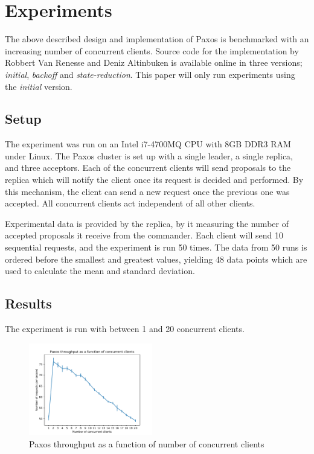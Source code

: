 \documentclass[conference]{IEEEtran}
\begin{document}
\section{Experiments}
The above described design and implementation of Paxos is benchmarked with an increasing number of concurrent clients.
Source code for the implementation by Robbert Van Renesse and Deniz Altinbuken is available online in three versions\cite{VanRenesse:Internet}; \textit{initial}, \textit{backoff} and \textit{state-reduction}.
This paper will only run experiments using the \textit{initial} version.

\subsection{Setup}
The experiment was run on an Intel i7-4700MQ CPU with 8GB DDR3 RAM under Linux.
The Paxos cluster is set up with a single leader, a single replica, and three acceptors.
Each of the concurrent clients will send proposals to the replica which will notify the client once its request is decided and performed. By this mechanism, the client can send a new request once the previous one was accepted.
All concurrent clients act independent of all other clients.

Experimental data is provided by the replica, by it measuring the number of accepted proposals it receive from the commander.
Each client will send 10 sequential requests, and the experiment is run 50 times.
The data from 50 runs is ordered before the smallest and greatest values, yielding 48 data points which are used to calculate the mean and standard deviation.

\subsection{Results}
The experiment is run with between 1 and 20 concurrent clients.

\begin{figure}[h]
	\includegraphics[width=0.48\textwidth]{figures/small_screen.pdf}
	\caption{Paxos throughput as a function of number of concurrent clients}
	\label{fig:paxos}
\end{figure}
\end{document}
